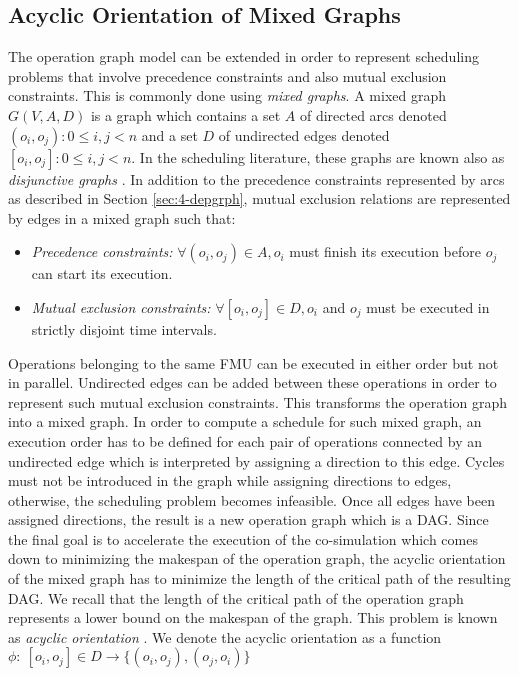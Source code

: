 \subsection{Acyclic Orientation of Mixed Graphs}

The operation graph model can be extended in order to represent scheduling problems that involve precedence constraints and also mutual exclusion constraints. This is commonly done using \textit{mixed graphs}. A mixed graph $G(V,A,D)$ is a graph which contains a set $A$ of directed arcs denoted $(o_i,o_j): 0 \leq i, j < n$ and a set $D$ of undirected edges denoted $[o_i,o_j]: 0 \leq i, j < n$. In the scheduling literature, these graphs are known also as \textit{disjunctive graphs} \cite{balas:1969}. In addition to the precedence constraints represented by arcs as described in Section \ref{sec:4-depgrph}, mutual exclusion relations are represented by edges in a mixed graph such that: 
\begin{itemize}
\item \textit{Precedence constraints:} $\forall (o_i,o_j) \in A, o_i$ must finish its execution before $o_j$ can start its execution.  
\item \textit{Mutual exclusion constraints:} $\forall [o_i,o_j] \in D, o_i$ and $o_j$ must be executed in strictly disjoint time intervals.
\end{itemize}

Operations belonging to the same FMU can be executed in either order but not in parallel. Undirected edges can be added between these operations in order to represent such mutual exclusion constraints. This transforms the operation graph into a mixed graph. In order to compute a schedule for such mixed graph, an execution order has to be defined for each pair of operations connected by an undirected edge which is interpreted by assigning a direction to this edge. Cycles must not be introduced in the graph while assigning directions to edges, otherwise, the scheduling problem becomes infeasible. Once all edges have been assigned directions, the result is a new operation graph which is a DAG.
Since the final goal is to accelerate the execution of the co-simulation which comes down to minimizing the makespan of the operation graph, the acyclic orientation of the mixed graph has to minimize the length of the critical path of the resulting DAG. We recall that the length of the critical path of the operation graph represents a lower bound on the makespan of the graph. This problem is known as \textit{acyclic orientation} \cite{barbosa:1999}. We denote the acyclic orientation as a function $\phi:\ {[o_i,o_j] \in D} \rightarrow \{(o_i,o_j),(o_j,o_i)\}$

